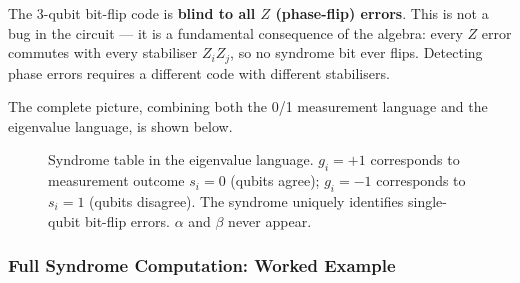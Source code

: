 \documentclass[11pt, a4paper]{article}
\theoremstyle{definition}
\theoremstyle{plain}
\theoremstyle{remark}
\begin{document}
\begin{caution}
The 3-qubit bit-flip code is \textbf{blind to all $Z$ (phase-flip)
errors}.
This is not a bug in the circuit --- it is a fundamental consequence of
the algebra: every $Z$ error commutes with every stabiliser
$Z_iZ_j$, so no syndrome bit ever flips.
Detecting phase errors requires a different code with different
stabilisers.
\end{caution}

The complete picture, combining both the 0/1 measurement language and
the eigenvalue language, is shown below.

\begin{figure}[H]
\centering
{}
\caption{Syndrome table in the eigenvalue language.
$g_i = +1$ corresponds to measurement outcome $s_i = 0$ (qubits agree);
$g_i = -1$ corresponds to $s_i = 1$ (qubits disagree).
The syndrome uniquely identifies single-qubit bit-flip errors.
$\alpha$ and $\beta$ never appear.}
\label{tab:3qubit-syndrome}
\end{figure}

\subsubsection{Full Syndrome Computation: Worked Example}
\end{document}
